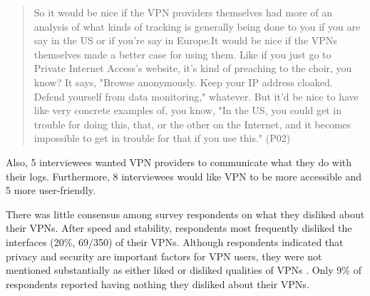 \begin{quote}So it would be nice if the VPN providers themselves had more of
    an analysis of what kinds of tracking is generally being done to you if
    you are say in the US or if you're say in Europe.It would be nice if the
    VPNs themselves made a better case for using them. Like if you just go to
    Private Internet Access's website, it's kind of preaching to the choir,
    you know? It says, "Browse anonymously. Keep your IP address cloaked.
    Defend yourself from data monitoring," whatever. But it'd be nice to have
    like very concrete examples of, you know, "In the US, you could get in
    trouble for doing this, that, or the other on the Internet, and it becomes
    impossible to get in trouble for that if you use this." (P02)\end{quote}


Also, 5 interviewees wanted VPN providers to communicate what they do with
their logs. Furthermore, 8 interviewees would like VPN to be more accessible
and 5 more user-friendly. 

There was little consensus among survey respondents on what they disliked about their VPNs.
After speed and stability, respondents most frequently disliked the interfaces
(20\%, 69/350) of their VPNs. Although respondents indicated that privacy and
security are important factors for VPN users, they were not mentioned
substantially as either liked or disliked qualities of VPNs . Only 9\% of respondents reported
having nothing they disliked about their VPNs.

